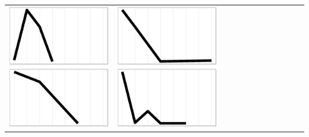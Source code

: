 \documentclass[conference]{worldcomp}
\begin{document}
\begin{table}
\begin{tabular}{ | b{1.5cm} | c | c | c | c | c | c | c | c | c | c | c |}
 \includegraphics[scale=0.08]{figures/ccaa.ps} &  
 \includegraphics[scale=0.08]{figures/cbaa.ps} &  

\end{tabular}
\end{table}
\end{document}

